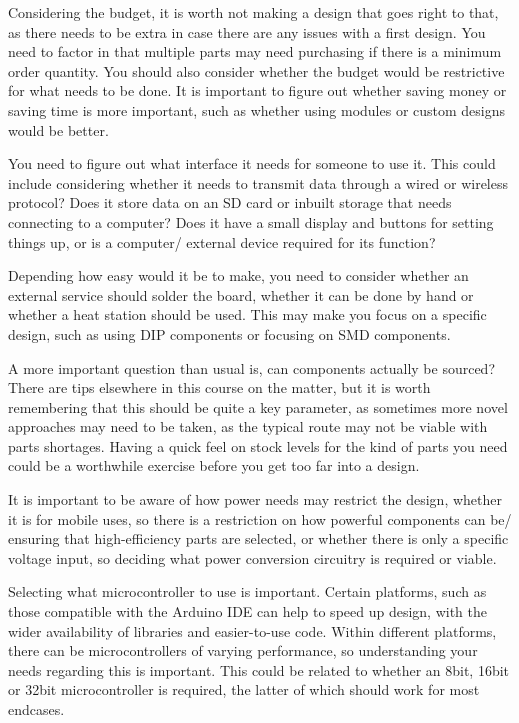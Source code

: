 \documentclass[a4paper,11pt]{report}
\begin{document}
Considering the budget, it is worth not making a design that goes right to that, as there needs to be extra in case there are any issues with a first design. You need to factor in that multiple parts may need purchasing if there is a minimum order quantity. You should also consider whether the budget would be restrictive for what needs to be done. It is important to figure out whether saving money or saving time is more important, such as whether using modules or custom designs would be better.

You need to figure out what interface it needs for someone to use it. This could include considering whether it needs to transmit data through a wired or wireless protocol? Does it store data on an SD card or inbuilt storage that needs connecting to a computer? Does it have a small display and buttons for setting things up, or is a computer/ external device required for its function?

Depending how easy would it be to make, you need to consider whether an external service should solder the board, whether it can be done by hand or whether a heat station should be used. This may make you focus on a specific design, such as using DIP components or focusing on SMD components.

A more important question than usual is, can components actually be sourced? There are tips elsewhere in this course on the matter, but it is worth remembering that this should be quite a key parameter, as sometimes more novel approaches may need to be taken, as the typical route may not be viable with parts shortages. Having a quick feel on stock levels for the kind of parts you need could be a worthwhile exercise before you get too far into a design.

It is important to be aware of how power needs may restrict the design, whether it is for mobile uses, so there is a restriction on how powerful components can be/ ensuring that high-efficiency parts are selected, or whether there is only a specific voltage input, so deciding what power conversion circuitry is required or viable.

Selecting what microcontroller to use is important. Certain platforms, such as those compatible with the Arduino IDE can help to speed up design, with the wider availability of libraries and easier-to-use code. Within different platforms, there can be microcontrollers of varying performance, so understanding your needs regarding this is important. This could be related to whether an 8bit, 16bit or 32bit microcontroller is required, the latter of which should work for most endcases.
\end{document}
